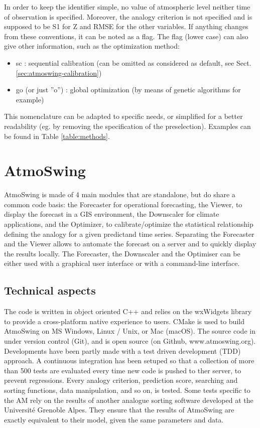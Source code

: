 \documentclass[review]{elsarticle}
\begin{document}
In order to keep the identifier simple, no value of atmospheric level neither time of observation is specified. Moreover, the analogy criterion is not specified and is supposed to be S1 for Z and RMSE for the other variables. If anything changes from these conventions, it can be noted as a flag. The flag (lower case) can also give other information, such as the optimization method:
\begin{itemize}
	\item sc : sequential calibration (can be omitted as considered as default, see Sect. \ref{sec:atmoswing-calibration})
	\item go (or just ''o'') : global optimization (by means of genetic algorithms for example)
\end{itemize}

This nomenclature can be adapted to specific needs, or simplified for a better readability (eg. by removing the specification of the preselection). Examples can be found in Table \ref{table:methods}.


\section{AtmoSwing}
\label{sec:atmoswing}

AtmoSwing is made of 4 main modules that are standalone, but do share a common code basis: the Forecaster for operational forecasting, the Viewer, to display the forecast in a GIS environment, the Downscaler for climate applications, and the Optimizer, to calibrate/optimize the statistical relationship defining the analogy for a given predictand time series. Separating the Forecaster and the Viewer allows to automate the forecast on a server and to quickly display the results locally. The Forecaster, the Downscaler and the Optimiser can be either used with a graphical user interface or with a command-line interface.


\subsection{Technical aspects}

The code is written in object oriented C++ and relies on the wxWidgets \citep{Smart2006} library to provide a cross-platform native experience to users. CMake is used to build AtmoSwing on MS Windows, Linux / Unix, or Mac (macOS). The source code in under version control (Git), and is open source (on Github, www.atmoswing.org). Developments have been partly made with a test driven development (TDD) approach. A continuous integration has been setuped so that a collection of more than 500 tests are evaluated every time new code is pushed to ther server, to prevent regressions. Every analogy criterion, prediction score, searching and sorting functions, data manipulation, and so on, is tested. Some tests specific to the AM rely on the results of another analogue sorting software developed at the Universit\'{e} Grenoble Alpes. They ensure that the results of AtmoSwing are exactly equivalent to their model, given the same parameters and data. 
\end{document}
